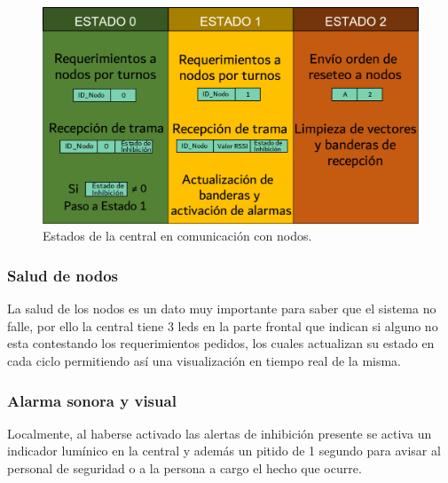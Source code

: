 \begin{figure}[h!]
	\centering
	\includegraphics[scale=.53]{images/central/maquina-estado-central.png}
    \caption{Estados de la central en comunicación con nodos.}
	\label{im:maq-est-central}
\end{figure}


\subsubsection{Salud de nodos}
\par La salud de los nodos es un dato muy importante para saber que el sistema no falle, por ello la central tiene 3 leds en la parte frontal que indican si alguno no esta contestando los requerimientos pedidos, los cuales actualizan su estado en cada ciclo permitiendo así una visualización en tiempo real de la misma. 

\subsubsection{Alarma sonora y visual}
\par Localmente, al haberse activado las alertas de inhibición presente se activa un indicador lumínico en la central y además un pitido de 1 segundo para avisar al personal de seguridad o a la persona a cargo el hecho que ocurre. 

